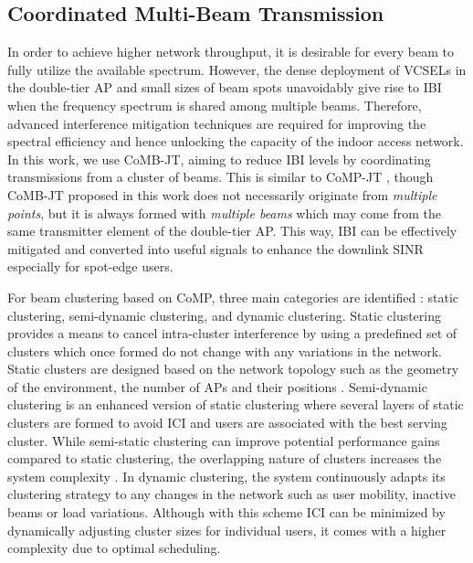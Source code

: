 \documentclass[lettersize,journal]{IEEEtran}
\begin{document}
\subsection{Coordinated Multi-Beam Transmission}
In order to achieve higher network throughput, it is desirable for every beam to fully utilize the available spectrum. However, the dense deployment of \acp{VCSEL} in the double-tier \ac{AP} and small sizes of beam spots unavoidably give rise to \ac{IBI} when the frequency spectrum is shared among multiple beams. Therefore, advanced interference mitigation techniques are required for improving the spectral efficiency and hence unlocking the capacity of the indoor access network. In this work, we use \ac{CoMB}-\ac{JT}, aiming to reduce \ac{IBI} levels by coordinating transmissions from a cluster of beams. This is similar to \ac{CoMP}-\ac{JT} \cite{Ma2015coordinated}, though \ac{CoMB}-\ac{JT} proposed in this work does not necessarily originate from \textit{multiple points}, but it is always formed with \textit{multiple beams} which may come from the same transmitter element of the double-tier \ac{AP}. This way, \ac{IBI} can be effectively mitigated and converted into useful signals to enhance the downlink \ac{SINR} especially for spot-edge users.

For beam clustering based on \ac{CoMP}, three main categories are identified \cite{Bassoy2017coordinated}: static clustering, semi-dynamic clustering, and dynamic clustering. Static clustering provides a means to cancel intra-cluster interference by using a predefined set of clusters which once formed do not change with any variations in the network. Static clusters are designed based on the network topology such as the geometry of the environment, the number of \acp{AP} and their positions \cite{Bassoy2017coordinated}. 
%
Semi-dynamic clustering is an enhanced version of static clustering where several layers of static clusters are formed to avoid \ac{ICI} and users are associated with the best serving cluster. While semi-static clustering can improve potential performance gains compared to static clustering, the overlapping nature of clusters increases the system complexity \cite{Bassoy2017coordinated}. 
%
In dynamic clustering, the system continuously adapts its clustering strategy to any changes in the network such as user mobility, inactive beams or load variations. Although with this scheme \ac{ICI} can be minimized by dynamically adjusting cluster sizes for individual users, it comes with a higher complexity due to optimal scheduling.
\end{document}
